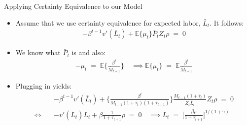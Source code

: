 \documentclass[10pt,c,aspectratio=1610,handout]{beamer}
\begin{document}
\begin{frame}{Applying Certainty Equivalence to our Model}%
  \begin{itemize}%
    \item[$\blacktriangleright$] Assume that we use certainty equivalence for expected labor, $\bar L_t$. It follows:%
    \begin{align*}%
      -\beta^{t-1} v'(\bar{L}_t) + \mathbb{E} \{ \mu_t \} \bar{P}_t Z_t \rho \; = \; 0%
    \end{align*}%
    \item[$\blacktriangleright$] We know what $\bar P_t$ is and also:%
    \begin{align*}%
      -\mu_t \; = \; \mathbb{E} \{ \frac{\beta^t}{\bar{M}_{t+1}} \} \quad \implies \mathbb{E} \{ \mu_t \} \; = \; \mathbb{E} \frac{\beta^t}{\bar{M}_{t+1}}%
    \end{align*}%
    \item[$\blacktriangleright$] Plugging in yields:%
    \begin{align*}%
      & -\beta^{t-1} v'(\bar{L}_t) + \Bigg \{ \frac{\beta^t}{M_{t-1}(1+\bar{\tau}_t)(1+\bar{\tau}_{t+1})} \Bigg \} \frac{M_{t-1}(1+\bar{\tau}_t)}{Z_t \bar{L}_t} Z_t \rho \; = \; 0 \\%
      \Leftrightarrow \quad & -v'(\bar{L}_t) \bar{L}_t + \beta \frac{1}{1+\bar{\tau}_{t+1}}  \rho \; = \; 0 \quad \implies \bar{L}_t \; = \; \Bigg[ \frac{\beta \rho}{1+\bar{\tau}_{t+1}} \Bigg]^{1/(1+\gamma)}%
    \end{align*}%
  \end{itemize}%
\end{frame}%
\end{document}

